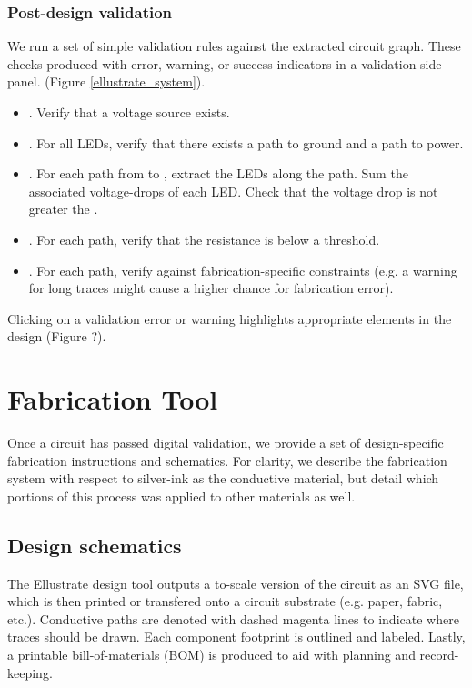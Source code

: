 \documentclass{sigchi}
\begin{document}
    \subsubsection{Post-design validation}
        We run a set of simple validation rules against the extracted circuit graph. These checks produced with error, warning, or success indicators in a validation side panel. (Figure \ref{ellustrate_system}). 
            \begin{itemize}
                \item {}. Verify that a voltage source exists.
                \item {}. For all LEDs, verify that there exists a path to ground and a path to power.
                \item {}. For each path from  to , extract the LEDs along the path. Sum the associated voltage-drops of each LED. Check that the voltage drop is not greater the .
                \item {}. For each path, verify that the resistance is below a threshold. 
                \item {}. For each path, verify against fabrication-specific constraints (e.g. a warning for long traces might cause a higher chance for fabrication error).
            \end{itemize}
         Clicking on a validation error or warning highlights appropriate elements in the design (Figure ?). 
    
\section{Fabrication Tool}
    Once a circuit has passed digital validation, we provide a set of design-specific fabrication instructions and schematics. For clarity, we describe the fabrication system with respect to silver-ink as the conductive material, but detail which portions of this process was applied to other materials as well. 

    \subsection{Design schematics}
        The Ellustrate design tool outputs a to-scale version of the circuit as an SVG file, which is then printed or transfered onto a circuit substrate (e.g. paper, fabric, etc.). Conductive paths are denoted with dashed magenta lines to indicate where traces should be drawn.
        Each component footprint is outlined and labeled. Lastly, a printable bill-of-materials (BOM) is produced to aid with planning and record-keeping.
\end{document}
